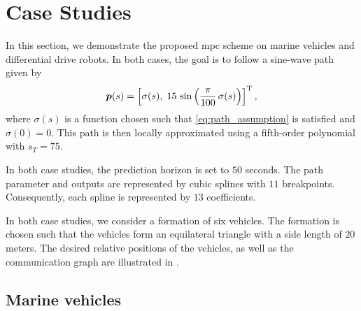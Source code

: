 \section{Case Studies}
\label{sec:case_studies}


In this section, we demonstrate the proposed \gls{mpc} scheme on marine vehicles and differential drive robots.
In both cases, the goal is to follow a sine-wave path given by
\begin{equation}
    \bm{p}(s) = \left[\sigma(s),\; 15\,\sin \left(\frac{\pi}{100}\,\sigma(s)\right)\right]^{\mathrm{T}},
\end{equation}
where $\sigma(s)$ is a function chosen such that \eqref{eq:path_assumption} is satisfied and $\sigma(0) = 0$.
This path is then locally approximated using a fifth-order polynomial with $s_T = 75$.

In both case studies, the prediction horizon is set to $50$ seconds.
The path parameter and outputs are represented by cubic splines with $11$ breakpoints.
Consequently, each spline is represented by $13$ coefficients.

In both case studies, we consider a formation of six vehicles.
The formation is chosen such that the vehicles form an equilateral triangle with a side length of $20$ meters.
The desired relative positions of the vehicles, as well as the communication graph are illustrated in .


\subsection{Marine vehicles}


